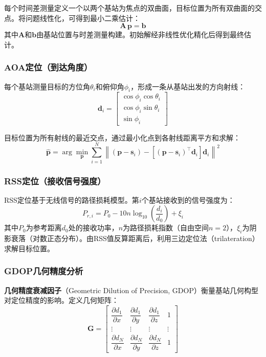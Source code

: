 \documentclass[12pt, a4paper]{article}
\begin{document}
每个时间差测量定义一个以两个基站为焦点的双曲面，目标位置为所有双曲面的交点。将问题线性化，可得到最小二乘估计：
\begin{equation}
  \bm{A}\,\bm{p} = \bm{b}
  \label{eq:tdoa_linear}
\end{equation}
其中$\bm{A}$和$\bm{b}$由基站位置与时差测量构建。初始解经非线性优化精化后得到最终估计\cite{ref_tdoa}。

\subsubsection{AOA定位（到达角度）}

每个基站测量目标的方位角$\theta_i$和俯仰角$\phi_i$，形成一条从基站出发的方向射线：
\begin{equation}
  \bm{d}_i = \begin{bmatrix}
    \cos\phi_i\cos\theta_i \\
    \cos\phi_i\sin\theta_i \\
    \sin\phi_i
  \end{bmatrix}
  \label{eq:aoa_direction}
\end{equation}

目标位置为所有射线的最近交点，通过最小化点到各射线距离平方和求解：
\begin{equation}
  \hat{\bm{p}} = \arg\min_{\bm{p}} \sum_{i=1}^{N}
  \left\|\left(\bm{p}-\bm{s}_i\right) - \left[\left(\bm{p}-\bm{s}_i\right)^\top\bm{d}_i\right]\bm{d}_i\right\|^2
  \label{eq:aoa_objective}
\end{equation}

\subsubsection{RSS定位（接收信号强度）}

RSS定位基于无线信号的路径损耗模型。第$i$个基站接收到的信号强度为：
\begin{equation}
  P_{r,i} = P_0 - 10n\log_{10}\!\left(\frac{d_i}{d_0}\right) + \xi_i
  \label{eq:rss_model}
\end{equation}
其中$P_0$为参考距离$d_0$处的接收功率，$n$为路径损耗指数（自由空间$n=2$），$\xi_i$为阴影衰落（对数正态分布）。由RSS值反算距离后，利用三边定位法（trilateration）求解目标位置。

\subsubsection{GDOP几何精度分析}

\textbf{几何精度衰减因子}（Geometric Dilution of Precision, GDOP）衡量基站几何构型对定位精度的影响。定义几何矩阵：
\begin{equation}
  \bm{G} = \begin{bmatrix}
    \dfrac{\partial d_1}{\partial x} & \dfrac{\partial d_1}{\partial y} & \dfrac{\partial d_1}{\partial z} & 1 \\[6pt]
    \vdots & \vdots & \vdots & \vdots \\[2pt]
    \dfrac{\partial d_N}{\partial x} & \dfrac{\partial d_N}{\partial y} & \dfrac{\partial d_N}{\partial z} & 1
  \end{bmatrix}
  \label{eq:gdop_G}
\end{equation}
\end{document}
